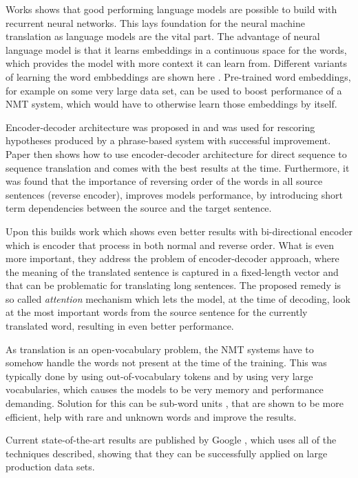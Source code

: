 \documentclass{ExcelAtFIT}
\begin{document}
Works \cite{neuralLanguageModels, neuralLanguageModels2, mikolovphd} shows that good performing language models are possible to build with recurrent neural networks. This lays foundation for the neural machine translation as language models are the vital part. The advantage of neural language model is that it learns embeddings in a continuous space for the words, which provides the model with more context it can learn from. Different variants of learning the word embbeddings are shown here \cite{word2vec,kingQueen,glove,fasttext}. Pre-trained word  embeddings, for example on some very large data set, can be used to boost performance of a NMT system, which would have to otherwise learn those embeddings by itself.

Encoder-decoder architecture was proposed in \cite{encoderDecoder} and was used for rescoring hypotheses produced by a phrase-based system with successful improvement. Paper \cite{seq2seq} then shows how to use encoder-decoder architecture for direct sequence to sequence translation and comes with the best results at the time. Furthermore, it was found that the importance of reversing order of the words  in all source sentences (reverse encoder), improves models performance, by introducing short term dependencies between the source and the target sentence.

Upon this builds work \cite{attention} which shows even better results with bi-directional encoder which is encoder that process in both normal and reverse order. What is even more important, they address the problem of encoder-decoder approach, where the meaning of the translated sentence is captured in a fixed-length vector and that can be problematic for translating long sentences. The proposed remedy is so called \emph{attention} mechanism which lets the model, at the time of decoding, look at the most important words from the source sentence for the currently translated word, resulting in even better performance.

As translation is an open-vocabulary problem, the NMT systems have to somehow handle the words not present at the time of the training. This was typically done by using out-of-vocabulary tokens and by using very large vocabularies, which causes the models to be very memory and performance demanding. Solution for this can be sub-word units \cite{mikolovSubwords, subwords}, that are shown to be more efficient, help with rare and unknown words and improve the results.

Current state-of-the-art results are published by Google \cite{googleBridgingGap,googleAttention}, which uses all of the techniques described, showing that they can be successfully applied on large production data sets.
\end{document}
